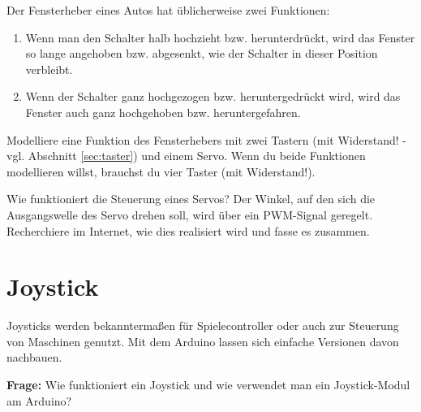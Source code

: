 \begin{projekt}[Fensterheber]\label{proj:fensterheber}
	Der Fensterheber eines Autos hat üblicherweise zwei Funktionen:	
	\begin{enumerate}[label=(\alph*), itemsep=0mm, parsep=0mm]
		\item Wenn man den Schalter halb hochzieht bzw. herunterdrückt, wird das Fenster so lange angehoben bzw. abgesenkt, wie der Schalter in dieser Position verbleibt.
		\item Wenn der Schalter ganz hochgezogen bzw. heruntergedrückt wird, wird das Fenster auch ganz hochgehoben bzw. heruntergefahren.
	\end{enumerate}

	Modelliere eine Funktion des Fensterhebers mit zwei Tastern (mit Widerstand! - vgl. Abschnitt \ref{sec:taster}) und einem Servo. Wenn du beide Funktionen modellieren willst, brauchst du vier Taster (mit Widerstand!).
\end{projekt}

\begin{recherche}{Wie funktioniert die Steuerung eines Servos?}
	Der Winkel, auf den sich die Ausgangswelle des Servo drehen soll, wird über ein PWM-Signal geregelt. Recherchiere im Internet, wie dies realisiert wird und fasse es zusammen.
\end{recherche}

\newpage
\section{Joystick}
\label{sec:joystick}
\setcounter{aufgabennummer}{0}
\setcounter{projektnummer}{0}
Joysticks werden bekanntermaßen für Spielecontroller oder auch zur Steuerung von Maschinen genutzt. Mit dem Arduino lassen sich einfache Versionen davon nachbauen.

\begin{ziel}
	\textbf{Frage:} Wie funktioniert ein Joystick und wie verwendet man ein Joystick-Modul am Arduino?
\end{ziel}

